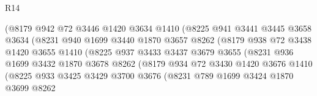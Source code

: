 \begin{lexlean}{R14}
\begin{coremodule}
                            (@8179
                              @942
                              @72
                              @3446
                              @1420
                              @3634
                              @1410
                              (@8225
                                @941
                                @3441
                                @3445
                                @3658
                                @3634
                                (@8231
                                  @940
                                  @1699
                                  @3440
                                  @1870
                                  @3657
                                  @8262
                                  (@8179
                                    @938
                                    @72
                                    @3438
                                    @1420
                                    @3655
                                    @1410
                                    (@8225
                                      @937
                                      @3433
                                      @3437
                                      @3679
                                      @3655
                                      (@8231
                                        @936
                                        @1699
                                        @3432
                                        @1870
                                        @3678
                                        @8262
                                        (@8179
                                          @934
                                          @72
                                          @3430
                                          @1420
                                          @3676
                                          @1410
                                          (@8225
                                            @933
                                            @3425
                                            @3429
                                            @3700
                                            @3676
                                            (@8231
                                              @789
                                              @1699
                                              @3424
                                              @1870
                                              @3699
                                              @8262

\end{coremodule}
\end{lexlean}
